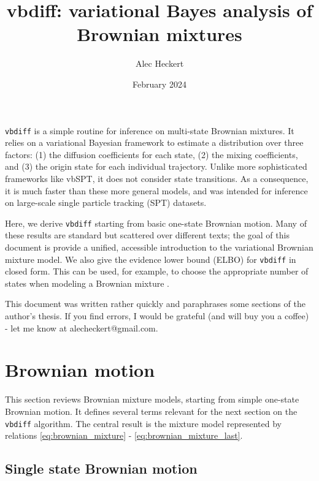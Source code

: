 \documentclass{article}
\begin{document}
\title{vbdiff: variational Bayes analysis of Brownian mixtures}
\date{February 2024}
\author{Alec Heckert}
\maketitle

\verb|vbdiff| is a simple routine for inference on multi-state Brownian
mixtures. It relies on a variational Bayesian framework to estimate a distribution
over three factors: (1) the diffusion coefficients for each state, (2) the mixing
coefficients, and (3) the origin state for each individual trajectory.
Unlike more sophisticated frameworks like vbSPT, it does not consider state transitions.
As a consequence, it is much faster than these more general models,
and was intended for inference on large-scale single particle tracking
(SPT) datasets. \newline

Here, we derive \verb|vbdiff| starting from basic one-state Brownian motion. Many of these results are standard but scattered over different texts; the goal
of this document is provide a unified, accessible introduction to the variational
Brownian mixture model. We also give the evidence lower bound (ELBO) for
\verb|vbdiff| in closed form. This can be used, for example, to choose the
appropriate number of states when modeling a Brownian mixture \cite{bishop2001}. \newline

This document was written rather quickly and paraphrases some
sections of the author's thesis. If you find errors, I would be
grateful (and will buy you a coffee) - let me know at
alecheckert@gmail.com.

\tableofcontents

\section{Brownian motion}\label{section:brownian_motion}

This section reviews Brownian mixture models, starting from
simple one-state Brownian motion. It defines several terms
relevant for the next section on the \verb|vbdiff| algorithm.
The central result is the mixture model represented by relations
\ref{eq:brownian_mixture} - \ref{eq:brownian_mixture_last}.

\subsection{Single state Brownian motion}
\end{document}

